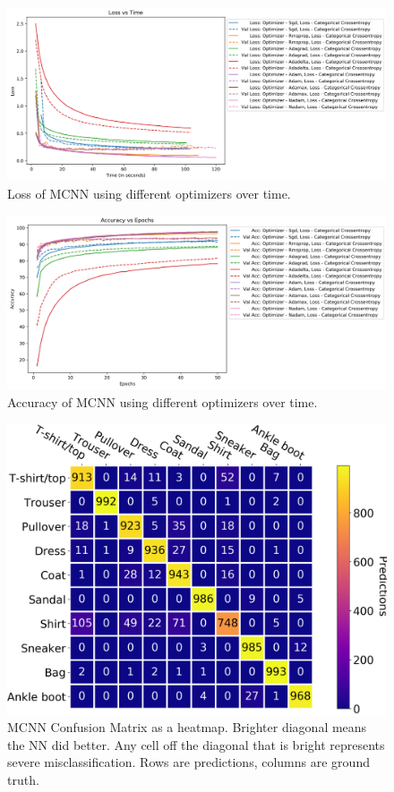 \documentclass[12pt]{article}
\begin{document}
\begin{figure}
  \centering
  \includegraphics[width=\linewidth]{task_4_loss_time.png}
  \caption{Loss of MCNN using different optimizers over time.}
  \label{fig:task_4_loss_time}
\end{figure}

\begin{figure}
  \centering
  \includegraphics[width=\linewidth]{task_4_acc_epochs.png}
  \caption{Accuracy of MCNN using different optimizers over time.}
  \label{fig:task_4_acc_epochs}
\end{figure}

\begin{figure}
  \centering
  \includegraphics[width=\linewidth]{task_4_cm.png}
  \caption{MCNN Confusion Matrix as a heatmap. Brighter diagonal means the NN did better. Any cell off
   the diagonal that is bright represents severe misclassification. Rows are predictions, columns are ground truth.}
  \label{fig:task_4_cm}
\end{figure}
\end{document}
